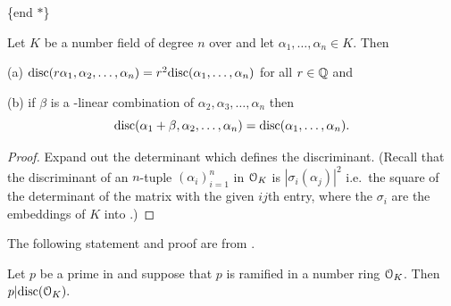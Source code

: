 \documentclass[10pt,a4paper]{amsart}
\begin{document}
\noindent \{end $*$\}

\begin{lem}
Let $K$ be a number field of degree $n$ over \Q{} and let
$\alpha_1,\dots,\alpha_n \in K.$ Then

(a) $\mathrm{disc}(r\alpha_1,\alpha_2,\dots,\alpha_n) =
r^2\mathrm{disc}(\alpha_1,\dots,\alpha_n)$ for all $r\in\mathbb{Q}$ and

(b) if $\beta$ is a \Q-linear combination of $\alpha_2,\alpha_3,\dots,\alpha_n$
then \[\mathrm{disc}(\alpha_1+\beta,\alpha_2,\dots,\alpha_n) =
\mathrm{disc}(\alpha_1,\dots,\alpha_n).\]
\end{lem}

\begin{proof}
Expand out the determinant which defines the discriminant. (Recall that the
discriminant of an $n$-tuple $(\alpha_i)_{i=1}^n$ in $\mathcal{O}_K$ is
$|\sigma_i(\alpha_j)|^2$ i.e.~the square of the determinant of the matrix with
the given $ij$th entry, where the $\sigma_i$ are the embeddings of $K$ into
\C.)
\end{proof}

The following statement and proof are from \cite[p. 72ff]{M}.

\begin{thm}
Let $p$ be a prime in \Z{} and suppose that $p$ is ramified in a number ring
$\mathcal{O}_K$. Then $p | \mathrm{disc}(\mathcal{O}_K).$
\end{thm}
\end{document}

